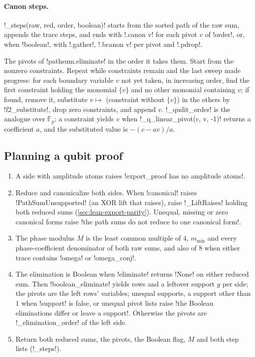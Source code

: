 {{{\paragraph{Canon steps.} \lexpy!_steps(raw, red, order, boolean)! starts from the sorted path of
the raw sum, appends the trace steps, and ends with \lexlean!.canon v! for each pivot $v$ of
\lexcode!order!, or, when \lexcode!boolean!, with \lexlean!.gather!, \lexlean!.bcanon v! per pivot and
\lexlean!.pdrop!.

\begin{algorithm}\label{alg:lean-export-elim-order}
The pivots of \lexpy!pathsum.eliminate! in the order it takes them. Start from the nonzero
constraints. Repeat while constraints remain and the last sweep made progress: for each
boundary variable $v$ not yet taken, in increasing order, find the first constraint holding the
monomial $\{v\}$ and no other monomial containing $v$; if found, remove it, substitute
$v \mapsto$ (constraint without $\{v\}$) in the others by \lexpy!f2_substitute!, drop zero
constraints, and append $v$. \lexpy!_qudit_order! is the analogue over $\mathbb{F}_p$: a constraint
yields $v$ when \lexpy!_q_linear_pivot(c, {v}, -1)! returns a coefficient $a$, and the
substituted value is $-(c - a v)/a$.
\end{algorithm}

\subsection{Planning a qubit proof}

\begin{algorithm}[\texttt{\_plan(raw\_l, raw\_r, m\_min=1, support=False)}]\label{alg:lean-export-plan}
\begin{enumerate}
\item A side with amplitude atoms raises \lexcode!export_proof has no amplitude atoms!.
\item Reduce and canonicalize both sides. When \lexpy!canonical! raises
\lexpy!PathSumUnsupported! (an XOR lift that raises), raise \lexpy!_LiftRaises! holding both reduced
sums (\cref{sec:lean-export-parity}). Unequal, missing or zero canonical forms raise
\lexcode!the path sums do not reduce to one canonical form!.
\item The phase modulus $M$ is the least common multiple of 4, $m_{\min}$ and every
phase-coefficient denominator of both raw sums, and also of 8 when either trace contains
\lexcode!omega! or \lexcode!omega_conj!.
\item The elimination is Boolean when \lexpy!eliminate! returns \lexpy!None! on either reduced sum.
Then \lexpy!boolean_eliminate! yields rows and a leftover support $g$ per side; the pivots are
the left rows' variables; unequal supports, a support other than $1$ when \lexpy!support! is
false, or unequal pivot lists raise \lexcode!the Boolean eliminations differ or leave a support!.
Otherwise the pivots are \lexpy!_elimination_order! of the left side.
\item Return both reduced sums, the pivots, the Boolean flag, $M$ and both step lists
(\lexpy!_steps!).
\end{enumerate}
\end{algorithm}

}}}

